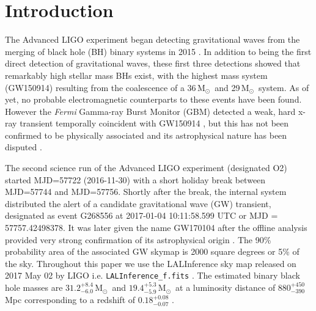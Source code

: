\documentclass[twocolumn]{aastex61}
\newcommand{\msun}{\mbox{M$_{\odot}$}}
\begin{document}

\section{Introduction}

The Advanced LIGO experiment began detecting gravitational waves from the merging of black hole (BH) binary systems in 
2015 \citep{theprizepaper}
.  In addition to being the first direct detection of gravitational waves, these first three detections 
showed that remarkably high stellar mass BHs exist, with the highest mass system (GW150914) resulting from the coalescence 
of a  36\,\msun\ and 29\,\msun\ system.  As of yet, no probable electromagnetic counterparts to these events have been found.  However the {\it Fermi} Gamma-ray Burst Monitor (GBM) detected a weak, hard x-ray transient temporally coincident with GW150914 \citep{2016ApJ...826L...6C},  but this has not been confirmed to be physically associated and its astrophysical nature has been disputed \citep{2016ApJ...827L..38G}. 


The second science run of the Advanced LIGO experiment (designated O2) started MJD=57722 (2016-11-30) with a short holiday break between MJD=57744 
and MJD=57756.
Shortly after the break, the internal system distributed the alert of a candidate gravitational wave (GW) transient, designated as event G268556 at 2017-01-04 10:11:58.599 UTC or MJD = 57757.42498378. It was later given the name GW170104 after the offline analysis provided very strong confirmation of its astrophysical origin \citep[as presented in][]{gw170104}. 
The 90\% probability area of the associated GW skymap is 2000 square degrees or 5\% of the
sky. Throughout this paper we use 
the LALInference sky map released on 2017 May 02 by LIGO 
i.e.  \texttt{LALInference\_f.fits} 
\citep{2015PhRvD..91d2003V}.  The estimated binary black hole masses are 
$31.2_{-6.0}^{+8.4}$\,\msun\
and 
 $19.4_{-5.9}^{+5.3}$\,\msun\
at a luminosity distance of 
 $880_{-390}^{+450}$\,Mpc corresponding to a redshift of 
 $0.18_{-0.07}^{+0.08}$ \citep{gw170104}. 
\end{document}
